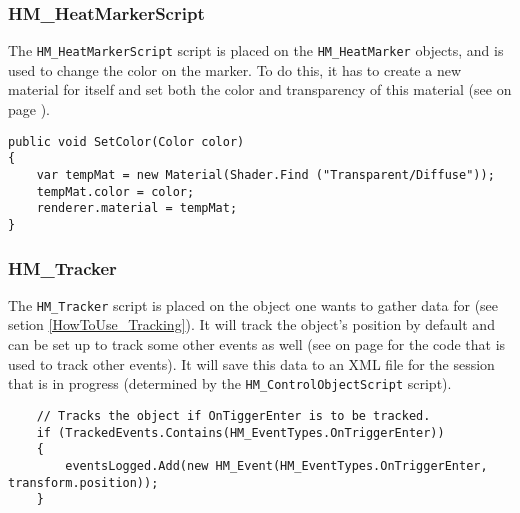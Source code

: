 \subsubsection*{HM\_HeatMarkerScript}

The \texttt{HM\_HeatMarkerScript} script is placed on the \texttt{HM\_HeatMarker} objects, and is used to change the color on the marker. To do this, it has to create a new material for itself and set both the color and transparency of this material (see  on page \pageref{code:OFS_03}).

\begin{lstlisting}
public void SetColor(Color color)
{
	var tempMat = new Material(Shader.Find ("Transparent/Diffuse"));
	tempMat.color = color;
	renderer.material = tempMat;
}
\end{lstlisting}

\subsubsection*{HM\_Tracker}

The \texttt{HM\_Tracker} script is placed on the object one wants to gather data for (see setion \ref{HowToUse_Tracking}). It will track the object's position by default and can be set up to track some other events as well (see  on page \pageref{code:OFS_04} for the code that is used to track other events). It will save this data to an XML file for the session that is in progress (determined by the \texttt{HM\_ControlObjectScript} script).

\begin{lstlisting}
	// Tracks the object if OnTiggerEnter is to be tracked.
	if (TrackedEvents.Contains(HM_EventTypes.OnTriggerEnter))
	{
		eventsLogged.Add(new HM_Event(HM_EventTypes.OnTriggerEnter, transform.position));
	}
\end{lstlisting}

